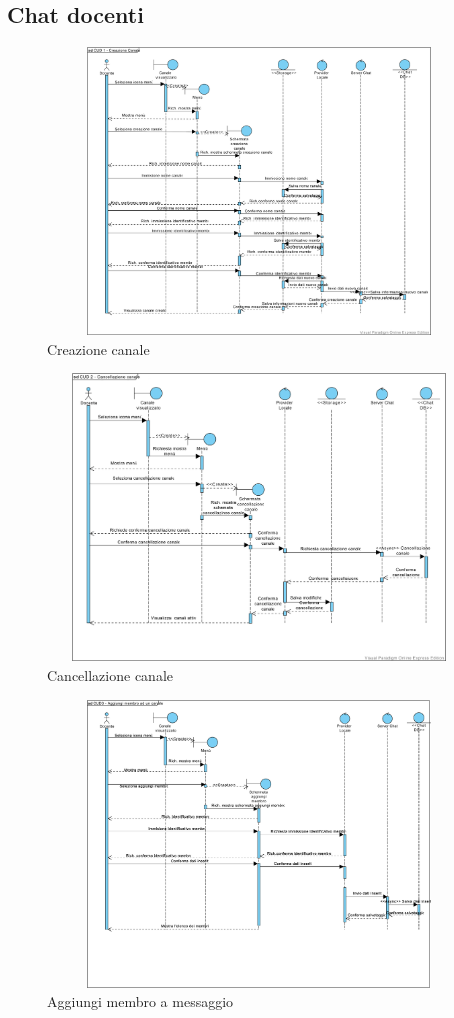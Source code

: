 \pagebreak
\subsection{Chat docenti}

\begin{figure}
	\centering
	\includegraphics[height=3in,width=5in]{imgs/gruppo6/sequence/CUD1_creazione_canale.pdf}
	\caption{Creazione canale}
	\label{fig:prova}
\end{figure}

\begin{figure}
	\centering
	\includegraphics[height=3in,width=5in]{imgs/gruppo6/sequence/CUD2_cancellazione_canale.pdf}
	\caption{Cancellazione canale}
	\label{fig:prova}
\end{figure}

\begin{figure}
	\centering
	\includegraphics[height=3in,width=5in]{imgs/gruppo6/sequence/CUD3_aggiungi_membro_ad_un_canale.pdf}
	\caption{Aggiungi membro a messaggio}
	\label{fig:prova}
\end{figure}

